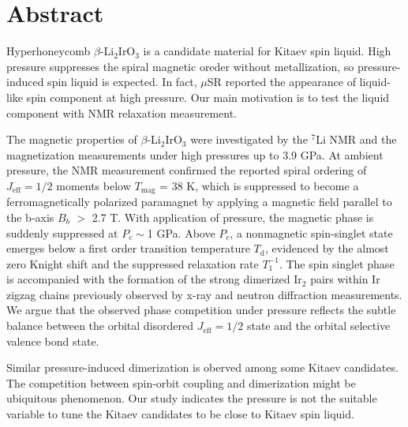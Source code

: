 \chapter*{Abstract}
Hyperhoneycomb $\beta$-Li$_2$IrO$_3$ is a candidate material for Kitaev spin liquid.
High pressure suppresses the spiral magnetic oreder without metallization, so pressure-induced spin liquid is expected.
In fact, $\mu$SR reported the appearance of liquid-like spin component at high pressure.
Our main motivation is to test the liquid component with NMR relaxation measurement. 

The magnetic properties of $\beta$-Li$_2$IrO$_3$ were investigated
by the ${}^7$Li NMR and the magnetization measurements under high pressures up to 3.9 GPa.
At ambient pressure, the NMR measurement confirmed the reported spiral ordering of $J_{\mathrm{eff}} = 1/2$ moments below $T_{\mathrm{mag}}$ = 38 K,
which is suppressed to become a ferromagnetically polarized paramagnet by applying a magnetic field parallel to the b-axis $B_b$ $>$ 2.7 T.
With application of pressure, the magnetic phase is suddenly suppressed at $P_c \sim$1 GPa.
Above $P_c$, a nonmagnetic spin-singlet state emerges below a first order transition temperature $T_\mathrm{d}$,
evidenced by the almost zero Knight shift and the suppressed relaxation rate $T^{-1}_1$.
The spin singlet phase is accompanied with the formation of the strong dimerized Ir$_2$ pairs within Ir zigzag chains previously observed by x-ray and neutron diffraction measurements.
We argue that the observed phase competition under pressure reflects the subtle balance between the orbital disordered $J_{\mathrm{eff}} = 1/2$ state
and the orbital selective valence bond state.

Similar pressure-induced dimerization is oberved among some Kitaev candidates.
The competition between spin-orbit coupling and dimerization might be ubiquitous phenomenon.
Our study indicates the pressure is not the suitable variable to tune the Kitaev candidates to be close to Kitaev spin liquid.
